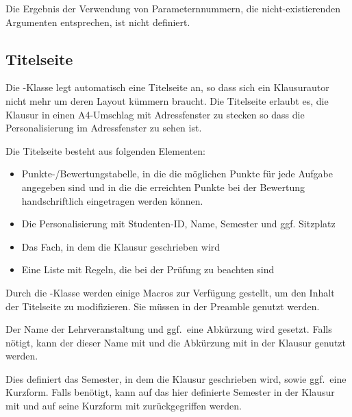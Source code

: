 \documentclass[
load=osgexam,
babel=ngerman
]{skdoc}
\begin{document}
\noindent{}
\medskip

Die Ergebnis der Verwendung von Parameternnummern, die nicht-existierenden Argumenten entsprechen, ist nicht definiert.
\subsection{Titelseite}
\label{sec:macro:title}
Die \thepkg-Klasse legt automatisch eine Titelseite an, so dass sich ein Klausurautor nicht mehr um deren Layout kümmern
braucht.
Die Titelseite erlaubt es, die Klausur in einen A4-Umschlag mit Adressfenster zu stecken so dass die Personalisierung im
Adressfenster zu sehen ist.

Die Titelseite besteht aus folgenden Elementen:
\begin{itemize}[nosep]
  \item Punkte-/Bewertungstabelle, in die die möglichen Punkte für jede Aufgabe angegeben sind und in die die erreichten Punkte bei
    der Bewertung handschriftlich eingetragen werden können.
  \item Die Personalisierung mit Studenten-ID, Name, Semester und ggf. Sitzplatz
  \item Das Fach, in dem die Klausur geschrieben wird
  \item Eine Liste mit Regeln, die bei der Prüfung zu beachten sind
\end{itemize}
Durch die \thepkg-Klasse werden einige Macros zur Verfügung gestellt, um den Inhalt der Titelseite zu modifizieren.
Sie müssen in der Preamble genutzt werden.

\DescribeMacro{} Der Name der Lehrveranstaltung und ggf.\ eine Abkürzung wird
gesetzt. Falls nötigt, kann der dieser Name mit  und die Abkürzung mit  in
der Klausur genutzt werden.

\DescribeMacro{} Dies definiert das Semester, in dem die Klausur geschrieben wird,
sowie ggf.\ eine Kurzform. Falls benötigt, kann auf das hier definierte Semester in der Klausur mit
 und auf seine Kurzform mit  zurückgegriffen werden.
\medskip
\end{document}
